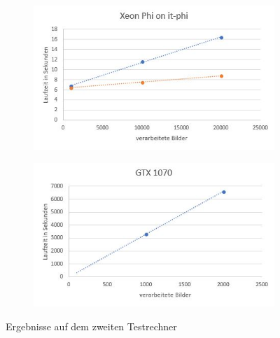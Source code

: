 \documentclass[../main.tex]{subfiles}
\begin{document}
\begin{figure}
	\begin{subfigure}{0.49\textwidth}
		\centering
		\includegraphics[width=\linewidth]{../images/Schmidt/bm_phi_phi.jpg}
	\end{subfigure}%
	\begin{subfigure}{0.49\textwidth}
		\centering
		\includegraphics[width=\linewidth]{../images/Schmidt/bm_gtx_std.jpg}
	\end{subfigure}%
	\caption{Ergebnisse auf dem zweiten Testrechner}
	\label{pics:diagrams_speedtest} 
\end{figure}
\end{document}
